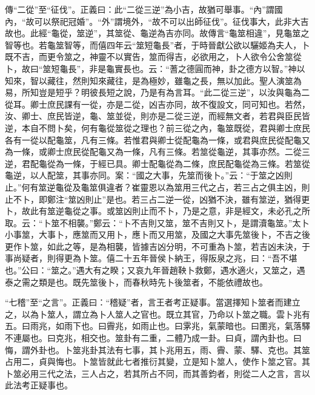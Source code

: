 {\noindent\zhuan{}\fzbyks 傳“二從”至“征伐”。正義曰：此“二從三逆”為小吉，故猶可舉事。“內”謂國內，“故可以祭祀冠婚”。“外”謂境外，“故不可以出師征伐”。征伐事大，此非大吉故也。此經“龜從，筮逆”，其筮從、龜逆為吉亦同。故傳言“龜筮相違”，見龜筮之智等也。若龜筮智等，而僖四年云“筮短龜長”者，于時晉獻公欲以驪姬為夫人，卜既不吉，而更令筮之，神靈不以實告，筮而得吉，必欲用之，卜人欲令公舍筮從卜，故曰“筮短龜長”，非是龜實長也。云：“蓍之德圓而神，卦之德方以智。”神以知來，智以藏往，然則知來藏往，是為極妙，雖龜之長，無以加此。聖人演筮為易，所知豈是短乎？明彼長短之說，乃是有為言耳。“此二從三逆”，以汝與龜為二從耳。卿士庶民課有一從，亦是二從，凶吉亦同，故不復設文，同可知也。若然，汝、卿士、庶民皆逆，龜、筮並從，則亦是二從三逆，而經無文者，若君與臣民皆逆，本自不問卜矣，何有龜從筮從之理也？前三從之內，龜筮既從，君與卿士庶民各有一從以配龜筮，凡有三條。若惟君與卿士從配龜為一條，或君與庶民從配龜又為一條，或卿士庶民從配龜又為一條，凡有三條。若筮從龜逆，其事亦然。二從三逆，君配龜從為一條，于經已具。卿士配龜從為二條，庶民配龜從為三條。若筮從龜逆，以人配筮，其事亦同。案：“國之大事，先筮而後卜。”云：“于筮之凶則止。”何有筮逆龜從及龜筮俱違者？崔靈恩以為筮用三代之占，若三占之俱主凶，則止不卜，即鄭注“筮凶則止”是也。若三占二逆一從，凶猶不決，雖有筮逆，猶得更卜，故此有筮逆龜從之事。或筮凶則止而不卜，乃是之意，非是經文，未必孔之所取。云：“卜筮不相襲。”鄭云：“卜不吉則又筮，筮不吉則又卜，是謂瀆龜筮。”太卜小事筮，大事卜，應筮而又用卜，應卜而又用筮，及國之大事先筮後卜，不吉之後更作卜筮，如此之等，是為相襲，皆據吉凶分明，不可重為卜筮，若吉凶未決，于事尚疑者，則得更為卜筮。僖二十五年晉侯卜納王，得阪泉之兆，曰：“吾不堪也。”公曰：“筮之。”遇大有之睽；又哀九年晉趙鞅卜救鄭，遇水適火，又筮之，遇泰之需之類是也。既先筮後卜，而春秋時先卜後筮者，不能依禮故也。 \par}

{\noindent\shu{}\fzkt “七稽”至“之言”。正義曰：“稽疑”者，言王者考正疑事。當選擇知卜筮者而建立之，以為卜筮人，謂立為卜人筮人之官也。既立其官，乃命以卜筮之職。雲卜兆有五。曰雨兆，如雨下也。曰霽兆，如雨止也。曰雺兆，氣蒙暗也。曰圛兆，氣落驛不連屬也。曰克兆，相交也。筮卦有二重，二體乃成一卦。曰貞，謂內卦也。曰悔，謂外卦也。卜筮兆卦其法有七事，其卜兆用五，雨、霽、蒙、驛、克也。其筮占用二，貞與悔也。卜筮皆就此七者推衍其變，立是知卜筮人，使作卜筮之官。其卜筮必用三代之法，三人占之，若其所占不同，而其善鈞者，則從二人之言，言以此法考正疑事也。 \par}

